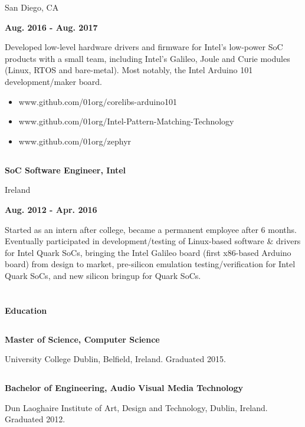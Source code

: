 \documentclass[a4paper,6pt]{article}
\begin{document}
\begin{minipage}{35em}
\begin{minipage}{20em}
{San Diego, CA}
\end{minipage}
\hfill
\begin{minipage}{12em}
{\bfseries Aug. 2016 - Aug. 2017}
\end{minipage}
\break

Developed low-level hardware drivers and firmware for Intel's low-power SoC products
with a small team, including Intel's Galileo, Joule and Curie modules (Linux, RTOS and
bare-metal). Most notably, the Intel Arduino 101 development/maker board.
\begin{itemize}
    \item www.github.com/01org/corelibs-arduino101
    \item www.github.com/01org/Intel-Pattern-Matching-Technology
    \item www.github.com/01org/zephyr
\end{itemize}
\dotfill

%
%
\subsection*{}
\begin{minipage}{20em}
{\bfseries SoC Software Engineer, Intel

Ireland}

\end{minipage}
\hfill
\begin{minipage}{12em}
{\bfseries \hfill Aug. 2012 - Apr. 2016}
\end{minipage}
\break

Started as an intern after college, became a permanent employee after 6 months. Eventually
participated in development/testing of Linux-based software \& drivers for Intel Quark SoCs,
bringing the Intel Galileo board (first x86-based Arduino board) from design to market,
pre-silicon emulation testing/verification for Intel Quark SoCs, and new silicon bringup for Quark SoCs.

\section*{}
{\Large \bfseries Education}

\dotfill
\subsection*{}
{\bfseries Master of Science, Computer Science}

University College Dublin, Belfield, Ireland. Graduated 2015.
\subsection*{}
{\bfseries Bachelor of Engineering, Audio Visual Media Technology}

Dun Laoghaire Institute of Art, Design and Technology, Dublin, Ireland. Graduated 2012.

\end{minipage}
\end{document}
